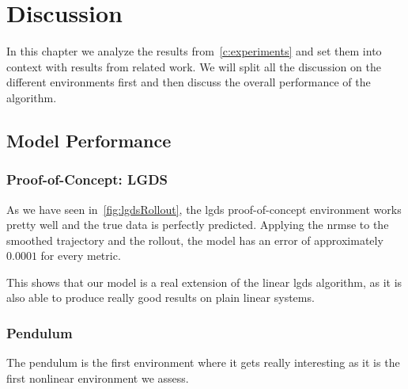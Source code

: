 \chapter{Discussion}
\label{c:discussion}



In this chapter we analyze the results from~\autoref{c:experiments} and set them into context with results from related work. We will split all the discussion on the different environments first and then discuss the overall performance of the \algname algorithm.

\section{Model Performance}
	\subsection{Proof-of-Concept: LGDS}
		As we have seen in~\autoref{fig:lgdsRollout}, the \ac{lgds} proof-of-concept environment works pretty well and the true data is perfectly predicted. Applying the \ac{nrmse} to the smoothed trajectory and the rollout, the model has an error of approximately \( 0.0001 \) for every metric.

		This shows that our model is a real extension of the linear \ac{lgds} algorithm, as it is also able to produce really good results on plain linear systems.

	\subsection{Pendulum}
		The pendulum is the first environment where it gets really interesting as it is the first nonlinear environment we assess.


